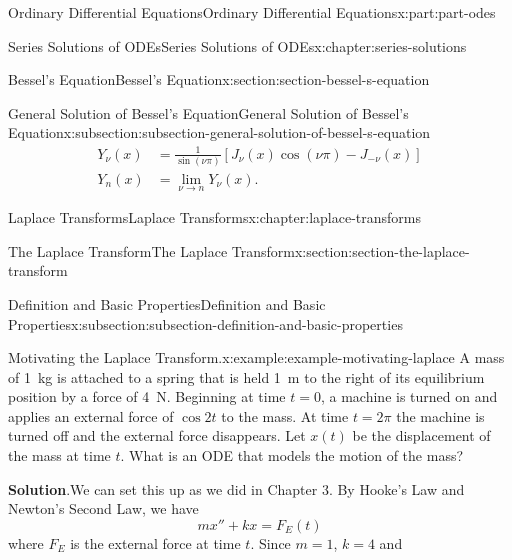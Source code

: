 \documentclass[oneside,10pt,]{book}
\newcommand{\blocktitlefont}{\relax}
\numberwithin{equation}{part}
\newcommand{\amp}{&}
\begin{document}
\begin{partptx}{Ordinary Differential Equations}{}{Ordinary Differential Equations}{}{}{x:part:part-odes}
\begin{chapterptx}{Series Solutions of ODEs}{}{Series Solutions of ODEs}{}{}{x:chapter:series-solutions}
\begin{sectionptx}{Bessel's Equation}{}{Bessel's Equation}{}{}{x:section:section-bessel-s-equation}
\begin{subsectionptx}{General Solution of Bessel's Equation}{}{General Solution of Bessel's Equation}{}{}{x:subsection:subsection-general-solution-of-bessel-s-equation}
\begin{align}
Y_{\nu}(x) \amp = \frac{1}{\sin(\nu\pi)}[J_{\nu}(x)\cos(\nu\pi) - J_{-\nu}(x)]\label{x:mrow:equation-bessel-second-kind-noninteger}\\
Y_{n}(x) \amp = \lim_{\nu\to n}Y_{\nu}(x)\text{.}\label{x:mrow:equation-bessel-second-kind-integer}
\end{align}
%
\end{subsectionptx}
\end{sectionptx}
\end{chapterptx}
%
\typeout{************************************************}
\typeout{************************************************}
%
\begin{chapterptx}{Laplace Transforms}{}{Laplace Transforms}{}{}{x:chapter:laplace-transforms}
%
%
\typeout{************************************************}
\typeout{************************************************}
%
\begin{sectionptx}{The Laplace Transform}{}{The Laplace Transform}{}{}{x:section:section-the-laplace-transform}
%
%
\typeout{************************************************}
\typeout{************************************************}
%
\begin{subsectionptx}{Definition and Basic Properties}{}{Definition and Basic Properties}{}{}{x:subsection:subsection-definition-and-basic-properties}
\begin{example}{Motivating the Laplace Transform.}{x:example:example-motivating-laplace}%
A mass of \SI{1}{\kilogram} is attached to a spring that is held \SI{1}{\meter} to the right of its equilibrium position by a force of \SI{4}{\newton}. Beginning at time \(t=0\), a machine is turned on and applies an external force of \(\cos2t\) to the mass. At time \(t=2\pi\) the machine is turned off and the external force disappears. Let \(x(t)\) be the displacement of the mass at time \(t\). What is an ODE that models the motion of the mass?%
\par\smallskip%
\noindent\textbf{\blocktitlefont Solution}.\hypertarget{g:solution:idp105548781263776}{}\quad{}We can set this up as we did in Chapter 3. By Hooke's Law and Newton's Second Law, we have%
\begin{equation*}
mx''+kx = F_{E}(t)
\end{equation*}
where \(F_{E}\) is the external force at time \(t\). Since \(m = 1\), \(k = 4\) and%
\begin{equation*}

\end{equation*}
\end{example}
\end{subsectionptx}
\end{sectionptx}
\end{chapterptx}
\end{partptx}
\end{document}
